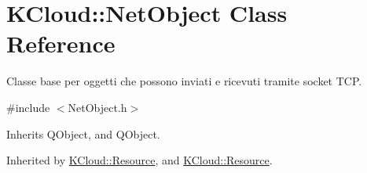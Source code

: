 \hypertarget{class_k_cloud_1_1_net_object}{\section{K\-Cloud\-:\-:Net\-Object Class Reference}
\label{class_k_cloud_1_1_net_object}
}


Classe base per oggetti che possono inviati e ricevuti tramite socket T\-C\-P.  




{\ttfamily \#include $<$Net\-Object.\-h$>$}



Inherits Q\-Object, and Q\-Object.



Inherited by \hyperlink{class_k_cloud_1_1_resource}{K\-Cloud\-::\-Resource}, and \hyperlink{class_k_cloud_1_1_resource}{K\-Cloud\-::\-Resource}.

